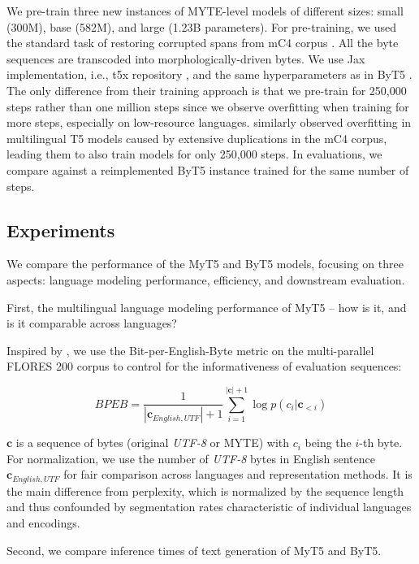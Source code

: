 We pre-train three new instances of \textsc{MYTE}-level models of different sizes: small (300M), base (582M), and large (1.23B parameters). For pre-training, we used the standard task of restoring corrupted spans from mC4 corpus \cite{raffel_exploring_2019}. All the byte sequences are transcoded into morphologically-driven bytes. We use Jax implementation, i.e., t5x repository \cite{roberts_scaling_2022}, and the same hyperparameters as in ByT5 \cite{xue_byt5_2022}. The only difference from their training approach is that we pre-train for 250,000 steps rather than one million steps since we observe overfitting when training for more steps, especially on low-resource languages. \citet{chung2023unimax} similarly observed overfitting in multilingual T5 models caused by extensive duplications in the mC4 corpus, leading them to also train models for only 250,000 steps. In evaluations, we compare against a reimplemented ByT5 instance trained for the same number of steps. 

\subsection{Experiments}
We compare the performance of the MyT5 and ByT5 models, focusing on three aspects: language modeling performance, efficiency, and downstream evaluation.

First, the multilingual language modeling performance of MyT5 -- how is it, and is it comparable across languages? 

Inspired by , we use the Bit-per-English-Byte metric on the multi-parallel FLORES 200 corpus to control for the informativeness of evaluation sequences:

\begin{equation}
    BPEB = \frac{1}{|\mathbf{c}_{English, UTF}|+1}\sum_{i=1}^{|\mathbf{c}|+1}\log p(c_i|\mathbf{c}_{<i})
\end{equation}

$\mathbf{c}$ is a sequence of bytes (original \emph{UTF-8} or \textsc{MYTE}) with $c_i$ being the $i$-th byte. For normalization, we use the number of \emph{UTF-8} bytes in English sentence $\mathbf{c}_{English, UTF}$ for fair comparison across languages and representation methods. It is the main difference from perplexity, which is normalized by the sequence length and thus confounded by segmentation rates characteristic of individual languages and encodings.

Second, we compare inference times of text generation of MyT5 and ByT5.

